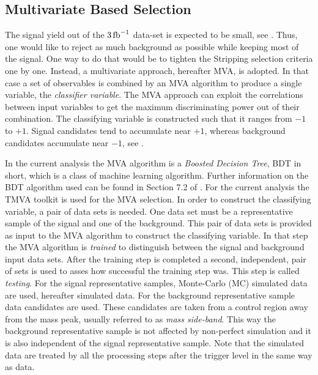 \subsection{Multivariate Based Selection}
\label{Multivariate_Based_Selection}

The \BsJpsiKst signal yield out of the $3 \mbox{\,fb}^{-1}$ data-set is expected to be small, see . Thus, one would like to
reject as much background as possible while keeping most of the signal. One way to do that would be to tighten the Stripping
selection criteria one by one. Instead, a multivariate approach, hereafter MVA, is adopted.
In that case a set of observables is combined by an MVA algorithm to produce a single variable, the {\it classifier variable}.
The MVA approach can exploit the correlations between input variables to get the maximum discriminating power out of their combination.
The classifying variable is constructed such that it ranges from $-1$ to $+1$. Signal candidates tend to accumulate near $+1$,
whereas background candidates accumulate near $-1$, see .

In the current analysis the MVA algorithm is a {\it Boosted Decision Tree}, BDT in short, which is a class
of machine learning  algorithm. Further information on the BDT algorithm used can be found in Section 7.2 of \cite{TMVA}.
For the current analysis the TMVA toolkit \cite{TMVA} is used for the MVA selection. In order to construct the classifying variable,
a pair of data sets is needed. One data set must be a representative sample of the signal and one of the background.
This pair of data sets is provided as input to the MVA algorithm to construct the classifying variable.
In that step the MVA algorithm is {\it trained} to distinguish between the signal and background input data sets.
After the training step is completed a second, independent, pair of sets is used to asses how
successful the training step was. This step is called {\it testing}.
For the signal representative samples, \BsJpsiKst Monte-Carlo (MC) simulated data are used, hereafter simulated data.
For the background representative sample data candidates are used. These candidates are taken from a control
region away from the \BsJpsiKst mass peak, usually referred to as {\it mass side-band}. This way the background representative sample
is not affected by non-perfect simulation and it is also independent of the signal representative sample.
Note that the simulated data are treated by all the processing steps after the \lzero trigger level in the same way as data.

